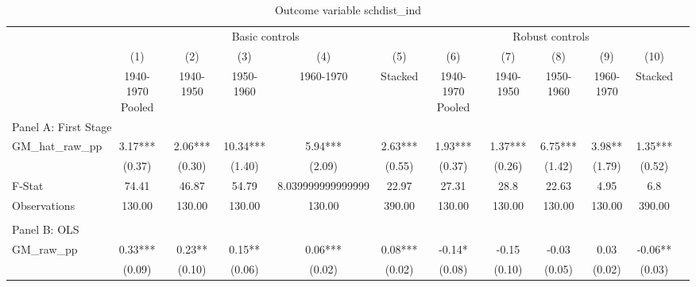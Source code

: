  \begin{table}[htbp]\centering {} \begin{threeparttable} \caption{Outcome variable schdist\_ind } \begin{tabular}{l*{11}{c}} \toprule
          &\multicolumn{5}{c}{Basic controls}                                   &\multicolumn{5}{c}{Robust controls}                                  \\\cmidrule(lr){2-6}\cmidrule(lr){7-11}
          &\multicolumn{1}{c}{(1)}&\multicolumn{1}{c}{(2)}&\multicolumn{1}{c}{(3)}&\multicolumn{1}{c}{(4)}&\multicolumn{1}{c}{(5)}&\multicolumn{1}{c}{(6)}&\multicolumn{1}{c}{(7)}&\multicolumn{1}{c}{(8)}&\multicolumn{1}{c}{(9)}&\multicolumn{1}{c}{(10)}\\
          &\multicolumn{1}{c}{1940-1970 Pooled}&\multicolumn{1}{c}{1940-1950}&\multicolumn{1}{c}{1950-1960}&\multicolumn{1}{c}{1960-1970}&\multicolumn{1}{c}{Stacked}&\multicolumn{1}{c}{1940-1970 Pooled}&\multicolumn{1}{c}{1940-1950}&\multicolumn{1}{c}{1950-1960}&\multicolumn{1}{c}{1960-1970}&\multicolumn{1}{c}{Stacked}\\
\cmidrule(lr){1-11}
\multicolumn{10}{l}{Panel A: First Stage}\\
\cmidrule(lr){1-11}
GM\_hat\_raw\_pp&      3.17***&      2.06***&     10.34***&      5.94***&      2.63***&      1.93***&      1.37***&      6.75***&      3.98** &      1.35***\\
          &    (0.37)   &    (0.30)   &    (1.40)   &    (2.09)   &    (0.55)   &    (0.37)   &    (0.26)   &    (1.42)   &    (1.79)   &    (0.52)   \\
\midrule
F-Stat    &     74.41   &     46.87   &     54.79   &8.039999999999999   &     22.97   &     27.31   &      28.8   &     22.63   &      4.95   &       6.8   \\
Observations&    130.00   &    130.00   &    130.00   &    130.00   &    390.00   &    130.00   &    130.00   &    130.00   &    130.00   &    390.00   \\
\cmidrule[\heavyrulewidth](lr){1-11} \\ \cmidrule[\heavyrulewidth](lr){1-11}
\multicolumn{10}{l}{Panel B: OLS}\\
\cmidrule(lr){1-11}
GM\_raw\_pp &      0.33***&      0.23** &      0.15** &      0.06***&      0.08***&     -0.14*  &     -0.15   &     -0.03   &      0.03   &     -0.06** \\
          &    (0.09)   &    (0.10)   &    (0.06)   &    (0.02)   &    (0.02)   &    (0.08)   &    (0.10)   &    (0.05)   &    (0.02)   &    (0.03)   \\

\end{tabular}
\end{threeparttable}
\end{table}
